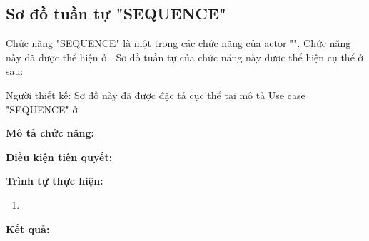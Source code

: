 \subsection{Sơ đồ tuần tự "SEQUENCE"}
\setcounter{figure}{0}

Chức năng "SEQUENCE" là một trong các chức năng của actor "". Chức năng này đã được thể hiện ở \myref{}. Sơ đồ tuần tự của chức năng này được thể hiện cụ thể ở \myref{} sau:

Người thiết kế:
Sơ đồ này đã được đặc tả cục thể tại mô tả Use case "SEQUENCE" ở \myreftb{}

\noindent
\textbf{Mô tả chức năng:}

\noindent
\textbf{Điều kiện tiên quyết:}

\noindent
\textbf{Trình tự thực hiện:}

\noindent
\begin{enumerate}
  \item
\end{enumerate}

\noindent
\textbf{Kết quả:}

